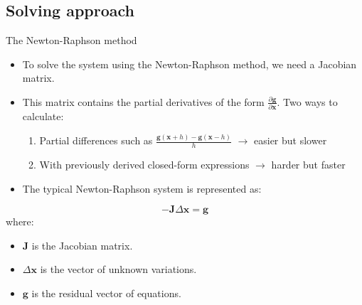 \subsection{Solving approach}
\begin{frame}{The Newton-Raphson method}
    \begin{itemize}
    \item To solve the system using the Newton-Raphson method, we need a Jacobian matrix. 
    
    \item This matrix contains the partial derivatives of the form $\frac{\partial{\bm{g}}}{\partial{\bm{x}}}$. Two ways to calculate:
    \begin{enumerate}
        \item Partial differences such as $\frac{\bm{g}(\bm{x} + h) - \bm{g}(\bm{x} - h)}{h}$ $\rightarrow$ easier but slower
        \item With previously derived closed-form expressions $\rightarrow$ harder but faster
    \end{enumerate}
    
    \item The typical Newton-Raphson system is represented as:
    \end{itemize}

    \begin{equation}
        -\mathbf{J} \Delta \mathbf{x} = \mathbf{g}
    \end{equation}
    where:
    \begin{itemize}
        \item $\mathbf{J}$ is the Jacobian matrix.
        \item $\Delta \mathbf{x}$ is the vector of unknown variations.
        \item $\mathbf{g}$ is the residual vector of equations.
    \end{itemize}
\end{frame}



